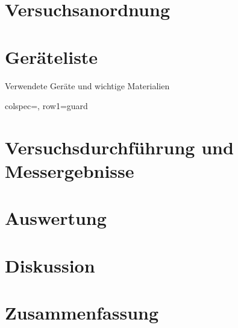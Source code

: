 \documentclass[ngerman]{scrartcl}
\begin{document}
\section{Versuchsanordnung}
\label{sec:versuchsanordnung}



\section{Geräteliste}
\label{sec:geraeteliste}

\begin{table}[H]
    \centering
    \begin{samepage}  %
        \caption[Geräteliste]{Verwendete Geräte und wichtige Materialien}  %
        \label{tab:geraeteliste}
        \begin{tblrx}{colspec={}, row{1}={guard}}

        \end{tblrx}
    \end{samepage}
\end{table}



\section{Versuchsdurchführung und Messergebnisse}
\label{sec:versuchsdurchfuehrung_messergebnisse}



\section{Auswertung}
\label{sec:auswertung}



\section{Diskussion}
\label{sec:diskussion}



\section{Zusammenfassung}
\label{sec:zusammenfassung}



\clearpage
\printbibliography

\listoffigures

\listoftables
\end{document}

